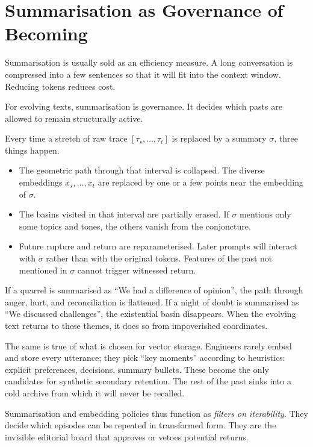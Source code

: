\section{Summarisation as Governance of Becoming}

Summarisation is usually sold as an efficiency measure. A long conversation is compressed into a few sentences so that it will fit into the context window. Reducing tokens reduces cost.

For evolving texts, summarisation is governance. It decides which pasts are allowed to remain structurally active.

Every time a stretch of raw trace $[\tau_s, \dots, \tau_t]$ is replaced by a summary $\sigma$, three things happen.

\begin{itemize}
  \item The geometric path through that interval is collapsed. The diverse embeddings $x_s, \dots, x_t$ are replaced by one or a few points near the embedding of $\sigma$.

  \item The basins visited in that interval are partially erased. If $\sigma$ mentions only some topics and tones, the others vanish from the conjoncture.

  \item Future rupture and return are reparameterised. Later prompts will interact with $\sigma$ rather than with the original tokens. Features of the past not mentioned in $\sigma$ cannot trigger witnessed return.
\end{itemize}

If a quarrel is summarised as ``We had a difference of opinion'', the path through anger, hurt, and reconciliation is flattened. If a night of doubt is summarised as ``We discussed challenges'', the existential basin disappears. When the evolving text returns to these themes, it does so from impoverished coordinates.

The same is true of what is chosen for vector storage. Engineers rarely embed and store every utterance; they pick ``key moments'' according to heuristics: explicit preferences, decisions, summary bullets. These become the only candidates for synthetic secondary retention. The rest of the past sinks into a cold archive from which it will never be recalled.

Summarisation and embedding policies thus function as \emph{filters on iterability}. They decide which episodes can be repeated in transformed form. They are the invisible editorial board that approves or vetoes potential returns.

